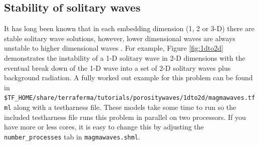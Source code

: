 \subsection{Stability of solitary waves}
\label{sec:stab-solit}


It has long been known that in each embedding dimension (1, 2 or 3-D)
there are stable solitary wave solutions, however, lower dimensional
waves are always unstable to higher dimensional waves
\cite{scott_magma_1986,barcilon_nonlinear-waves_1986,barcilon_solitary_1989}.
For example, Figure \ref{fig:1dto2d} demonstrates the instability of a
1-D solitary wave in 2-D dimensions with the eventual break down of the
1-D wave into a set of 2-D solitary waves plus background radiation.
A fully worked out example for this problem can be found in
\texttt{\$TF\_HOME/share/terraferma/tutorials/porositywaves/1dto2d/magmawaves.tfml}
along with a testharness file.  These models take some time to run so
the included testharness file runs this problem in parallel on two
processors.  If you have more or less cores, it is easy to change this
by adjusting the \texttt{number\_processes} tab in
\texttt{magmawaves.shml}.


